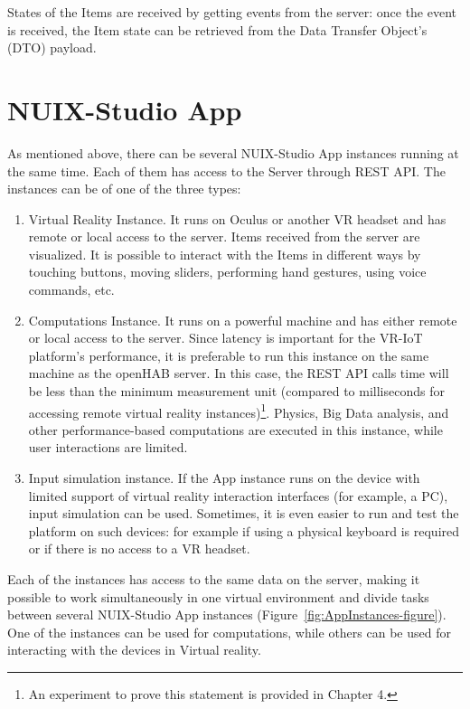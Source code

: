 States of the Items are received by getting events from the server: once the event is received, the Item state can be retrieved from the Data Transfer Object's (DTO) payload.

\section{NUIX-Studio App}

As mentioned above, there can be several NUIX-Studio App instances running at the same time. Each of them has access to the Server through REST API. The instances can be of one of the three types:

\begin{enumerate}
    \item Virtual Reality Instance. It runs on Oculus or another VR headset and has remote or local access to the server. Items received from the server are visualized. It is possible to interact with the Items in different ways by touching buttons, moving sliders, performing hand gestures, using voice commands, etc. 
    \item Computations Instance. It runs on a powerful machine and has either remote or local access to the server. Since latency is important for the VR-IoT platform's performance, it is preferable to run this instance on the same machine as the openHAB server. In this case, the REST API calls time will be less than the minimum measurement unit (compared to milliseconds for accessing remote virtual reality instances)\footnote{An experiment to prove this statement is provided in Chapter 4.}. Physics, Big Data analysis, and other performance-based computations are executed in this instance, while user interactions are limited.
    \item Input simulation instance. If the App instance runs on the device with limited support of virtual reality interaction interfaces (for example, a PC), input simulation can be used. Sometimes, it is even easier to run and test the platform on such devices: for example if using a physical keyboard is required or if there is no access to a VR headset.
\end{enumerate}

Each of the instances has access to the same data on the server, making it possible to work simultaneously in one virtual environment and divide tasks between several NUIX-Studio App instances (Figure~\ref{fig:AppInstances-figure}). One of the instances can be used for computations, while others can be used for interacting with the devices in Virtual reality.

